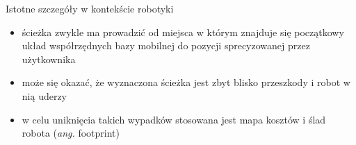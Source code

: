 \begin{frame}
{Istotne szczegóły w kontekście robotyki}
	\begin{itemize}
		\item ścieżka zwykle ma prowadzić od miejsca w którym znajduje się początkowy układ współrzędnych bazy mobilnej do pozycji sprecyzowanej przez użytkownika
		\item może się okazać, że wyznaczona ścieżka jest zbyt blisko przeszkody i robot w nią uderzy
		\item w celu uniknięcia takich wypadków stosowana jest mapa kosztów i ślad robota (\textit{ang.} footprint)
	\end{itemize}
\end{frame}